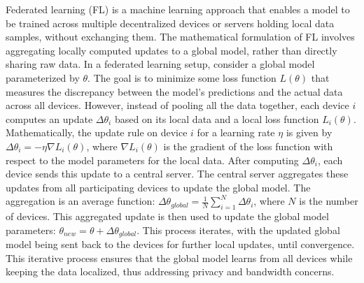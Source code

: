  Federated learning (FL) is a machine learning approach that enables a model to be trained across multiple decentralized devices or servers holding local data samples, without exchanging them. The mathematical formulation of FL involves aggregating locally computed updates to a global model, rather than directly sharing raw data. In a federated learning setup, consider a global model parameterized by \(\theta\). The goal is to minimize some loss function \(L(\theta)\) that measures the discrepancy between the model's predictions and the actual data across all devices. However, instead of pooling all the data together, each device \(i\) computes an update \(\Delta \theta_i\) based on its local data and a local loss function \(L_i(\theta)\). Mathematically, the update rule on device \(i\) for a learning rate \(\eta\) is given by \(\Delta \theta_i = -\eta \nabla L_i(\theta)\), where \(\nabla L_i(\theta)\) is the gradient of the loss function with respect to the model parameters for the local data. After computing \(\Delta \theta_i\), each device sends this update to a central server. The central server aggregates these updates from all participating devices to update the global model. The aggregation is an average function: \(\Delta \theta_{global} = \frac{1}{N} \sum_{i=1}^{N} \Delta \theta_i\), where \(N\) is the number of devices. This aggregated update is then used to update the global model parameters: \(\theta_{new} = \theta + \Delta \theta_{global}\). This process iterates, with the updated global model being sent back to the devices for further local updates, until convergence. This iterative process ensures that the global model learns from all devices while keeping the data localized, thus addressing privacy and bandwidth concerns.



